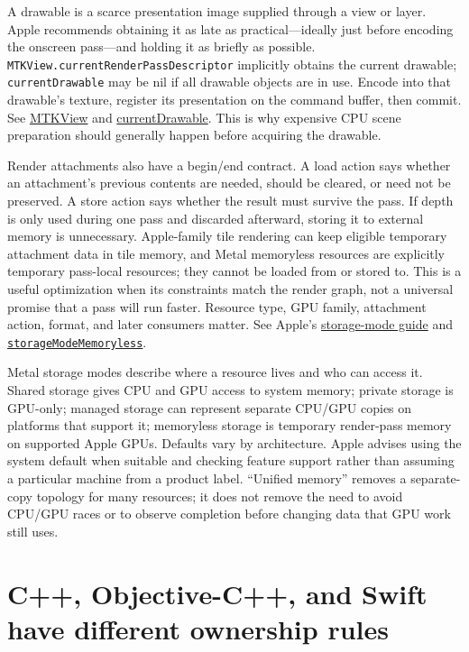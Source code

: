 A drawable is a scarce presentation image supplied through a view or layer. Apple recommends obtaining it as late as practical---ideally just before encoding the onscreen pass---and holding it as briefly as possible. \texttt{MTKView.currentRenderPassDescriptor} implicitly obtains the current drawable; \texttt{currentDrawable} may be nil if all drawable objects are in use. Encode into that drawable's texture, register its presentation on the command buffer, then commit. See \href{https://developer.apple.com/documentation/metalkit/mtkview/}{MTKView} and \href{https://developer.apple.com/documentation/MetalKit/MTKView/currentDrawable}{currentDrawable}. This is why expensive CPU scene preparation should generally happen before acquiring the drawable.

Render attachments also have a begin/end contract. A load action says whether an attachment's previous contents are needed, should be cleared, or need not be preserved. A store action says whether the result must survive the pass. If depth is only used during one pass and discarded afterward, storing it to external memory is unnecessary. Apple-family tile rendering can keep eligible temporary attachment data in tile memory, and Metal memoryless resources are explicitly temporary pass-local resources; they cannot be loaded from or stored to. This is a useful optimization when its constraints match the render graph, not a universal promise that a pass will run faster. Resource type, GPU family, attachment action, format, and later consumers matter. See Apple's \href{https://developer.apple.com/documentation/metal/setting-resource-storage-modes}{storage-mode guide} and \href{https://developer.apple.com/documentation/metal/mtlresourceoptions/storagemodememoryless}{\texttt{storageModeMemoryless}}.

Metal storage modes describe where a resource lives and who can access it. Shared storage gives CPU and GPU access to system memory; private storage is GPU-only; managed storage can represent separate CPU/GPU copies on platforms that support it; memoryless storage is temporary render-pass memory on supported Apple GPUs. Defaults vary by architecture. Apple advises using the system default when suitable and checking feature support rather than assuming a particular machine from a product label. ``Unified memory'' removes a separate-copy topology for many resources; it does not remove the need to avoid CPU/GPU races or to observe completion before changing data that GPU work still uses.

\section{C++, Objective-C++, and Swift have different ownership rules}\label{05-engine-i-ch019-c-objective-c-and-swift-have-different-ownership-rules}


